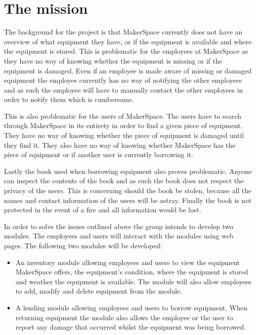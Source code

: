 \section{The mission}
The background for the project is that MakerSpace currently does not have an overview of what equipment they have, or if the equipment is available and where the equipment is stored.
This is problematic for the employees at MakerSpace as they have no way of knowing whether the equipment is missing or if the equipment is damaged.
Even if an employee is made aware of missing or damaged equipment the employee currently has no way of notifying the other employees and as such the employee will have to manually contact the other employees in order to notify them which is cumbersome.

This is also problematic for the users of MakerSpace.
The users have to search through MakerSpace in its entirety in order to find a given piece of equipment.
They have no way of knowing whether the piece of equipment is damaged until they find it.
They also have no way of knowing whether MakerSpace has the piece of equipment or if another user is currently borrowing it.

Lastly the book used when borrowing equipment also proves problematic.
Anyone can inspect the contents of the book and as such the book does not respect the privacy of the users.
This is concerning should the book be stolen, because all the names and contact information of the users will be astray.
Finally the book is not protected in the event of a fire and all information would be lost.

In order to solve the issues outlined above the group intends to develop two modules.
The employees and users will interact with the modules using web pages.
The following two modules will be developed:
\begin{itemize}
    \item An inventory module allowing employees and users to view the equipment MakerSpace offers, the equipment's condition, where the equipment is stored and weather the equipment is available.
    The module will also allow employees to add, modify and delete equipment from the module.
    \item A lending module allowing employees and users to borrow equipment.
    When returning equipment the module also allows the employee or the user to report any damage that occurred whilst the equipment was being borrowed.
\end{itemize}

